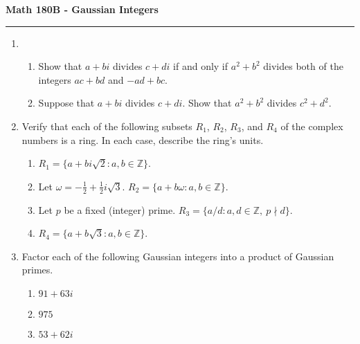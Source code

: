 \documentclass[11pt,letterpaper]{report}
\newcommand{\integers}{\mathbb{Z}}
\begin{document}
\begin{center}
{\bf \Large Math 180B - Gaussian Integers}
\vspace{0.2cm}
\hrule
\end{center}


\begin{enumerate}
	\item \begin{enumerate}
		\item Show that $a+bi$ divides $c+di$ if and only if $a^2+b^2$ divides both of the integers $ac+bd$ and $-ad+bc$.
		\item Suppose that $a+bi$ divides $c+di$. Show that $a^2+b^2$ divides $c^2+d^2$.
	\end{enumerate}

	\vfill

	\item Verify that each of the following subsets $R_1$, $R_2$, $R_3$, and $R_4$ of the complex numbers is a ring. In each case, describe the ring's units.
	\begin{enumerate}
		\item $R_1 = \{a+bi\sqrt{2}: a,b\in \integers\}$.
		\item Let $\omega = -\frac{1}{2} + \frac{1}{2}i\sqrt{3}$. $R_2 = \{a + b\omega: a,b\in \integers\}$.
		\item Let $p$ be a fixed (integer) prime. $R_3 = \{a/d: a,d\in \integers,\ p\nmid d\}$.
		\item $R_4 = \{a+b\sqrt{3}: a,b\in \integers\}$.
	\end{enumerate}

	\vfill

	\item Factor each of the following Gaussian integers into a product of Gaussian primes.
	\begin{enumerate}
		\item $91+63i$
		\item $975$
		\item $53+62i$
	\end{enumerate}

	\vfill
\end{enumerate}
\end{document}
